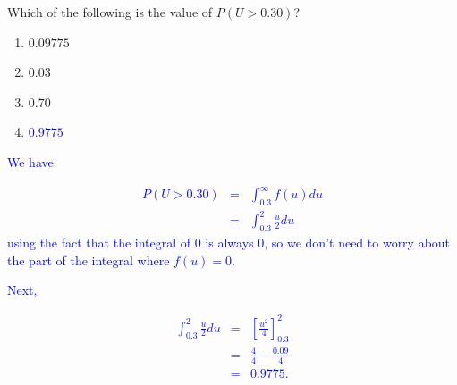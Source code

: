 \documentclass[11pt,a4paper]{article}
\begin{document}
\begin{question}
\begin{enumerate}
Which of the following is the value of $P(U>0.30)$?

\begin{enumerate}
\item $0.09775$
\item $0.03$
\item $0.70$
\item \textcolor{blue}{$0.9775$}
\end{enumerate}

\textcolor{blue}{We have}

\textcolor{blue}{
\begin{eqnarray*}
P(U>0.30)&=&\int_{0.3}^{\infty}f(u)du\\
&=& \int_{0.3}^{2}\frac{u}{2}du
\end{eqnarray*}
}
\textcolor{blue}{using the fact that the integral of 0 is always 0, so we don't need to worry about the part of the integral where $f(u)=0$.}

\textcolor{blue}{Next,}

\textcolor{blue}{
\begin{eqnarray*}
\int_{0.3}^{2}\frac{u}{2}du &=&\left[\frac{u^2}{4}\right]^2_{0.3}\\
&=&\frac{4}{4}-\frac{0.09}{4}\\
&=&0.9775.
\end{eqnarray*}
}


\end{enumerate}



\end{question}
\end{document}
